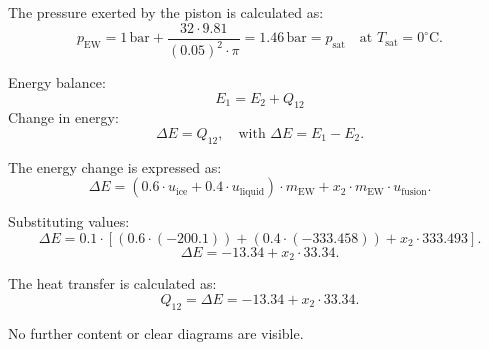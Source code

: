 The pressure exerted by the piston is calculated as:  
\[
p_{\text{EW}} = 1 \, \text{bar} + \frac{32 \cdot 9.81}{(0.05)^2 \cdot \pi} = 1.46 \, \text{bar} = p_{\text{sat}} \quad \text{at } T_{\text{sat}} = 0^\circ\text{C}.
\]

Energy balance:  
\[
E_1 = E_2 + Q_{12}
\]  
Change in energy:  
\[
\Delta E = Q_{12}, \quad \text{with } \Delta E = E_1 - E_2.
\]  

The energy change is expressed as:  
\[
\Delta E = (0.6 \cdot u_{\text{ice}} + 0.4 \cdot u_{\text{liquid}}) \cdot m_{\text{EW}} + x_2 \cdot m_{\text{EW}} \cdot u_{\text{fusion}}.
\]  

Substituting values:  
\[
\Delta E = 0.1 \cdot \left[ (0.6 \cdot (-200.1)) + (0.4 \cdot (-333.458)) + x_2 \cdot 333.493 \right].
\]  
\[
\Delta E = -13.34 + x_2 \cdot 33.34.
\]  

The heat transfer is calculated as:  
\[
Q_{12} = \Delta E = -13.34 + x_2 \cdot 33.34.
\]  

No further content or clear diagrams are visible.
